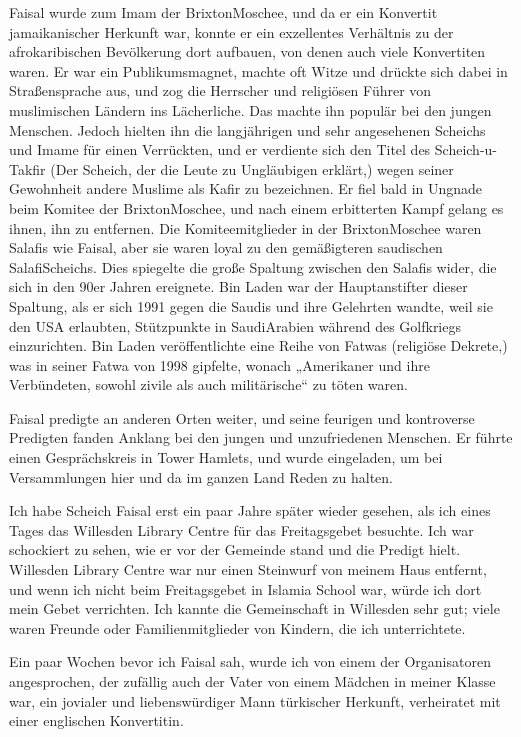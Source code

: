 \documentclass[12pt]{memoir}
\begin{document}
Faisal wurde zum Imam der Brixton\–Moschee,
und da er ein Konvertit jamaikanischer Herkunft war,
konnte er ein exzellentes Verhältnis
zu der afro\–karibischen Bevölkerung dort aufbauen,
von denen auch viele Konvertiten waren.
Er war ein Publikumsmagnet,
machte oft Witze und drückte sich dabei in Straßensprache aus,
und zog die Herrscher und religiösen Führer
von muslimischen Ländern ins Lächerliche.
Das machte ihn populär bei den jungen Menschen.
Jedoch hielten ihn die langjährigen und sehr angesehenen Scheichs und Imame
für einen Verrückten, und er verdiente sich den Titel des Scheich-u-Takfir
(Der Scheich, der die Leute zu Ungläubigen erklärt,)
wegen seiner Gewohnheit andere Muslime als Kafir zu bezeichnen.
Er fiel bald in Ungnade beim Komitee der Brixton\–Moschee,
und nach einem erbitterten Kampf gelang es ihnen, ihn zu entfernen.
Die Komiteemitglieder in der Brixton\–Moschee waren Salafis wie Faisal,
aber sie waren loyal zu den gemäßigteren saudischen Salafi\–Scheichs.
Dies spiegelte die große Spaltung zwischen den Salafis wider,
die sich in den 90er Jahren ereignete.
Bin Laden war der Hauptanstifter dieser Spaltung,
als er sich 1991 gegen die Saudis und ihre Gelehrten wandte,
weil sie den USA erlaubten,
Stützpunkte in Saudi\–Arabien während des Golfkriegs einzurichten.
Bin Laden veröffentlichte eine Reihe von Fatwas (religiöse Dekrete,)
was in seiner Fatwa von 1998 gipfelte,
wonach „Amerikaner und ihre Verbündeten,
sowohl zivile als auch militärische“ zu töten waren.

Faisal predigte an anderen Orten weiter,
und seine feurigen und kontroverse Predigten fanden Anklang
bei den jungen und unzufriedenen Menschen.
Er führte einen Gesprächskreis in Tower Hamlets, und wurde eingeladen,
um bei Versammlungen hier und da im ganzen Land Reden zu halten.

Ich habe Scheich Faisal erst ein paar Jahre später wieder gesehen,
als ich eines Tages das Willesden Library Centre
für das Freitagsgebet besuchte.
Ich war schockiert zu sehen, wie er vor der Gemeinde stand
und die Predigt hielt.
Willesden Library Centre war nur einen Steinwurf von meinem Haus entfernt,
und wenn ich nicht beim Freitagsgebet in Islamia School war,
würde ich dort mein Gebet verrichten.
Ich kannte die Gemeinschaft in Willesden sehr gut;
viele waren Freunde oder Familienmitglieder von Kindern,
die ich unterrichtete.

Ein paar Wochen bevor ich Faisal sah,
wurde ich von einem der Organisatoren angesprochen,
der zufällig auch der Vater von einem Mädchen in meiner Klasse war,
ein jovialer und liebenswürdiger Mann türkischer Herkunft,
verheiratet mit einer englischen Konvertitin.
\end{document}

